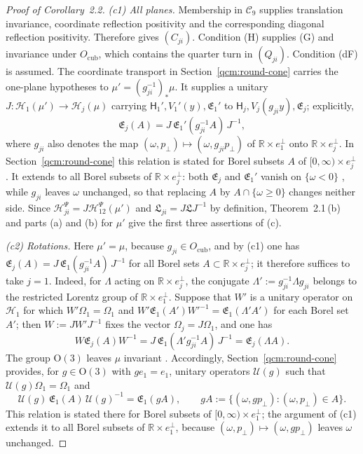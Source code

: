\documentclass[11pt,letterpaper,reqno]{amsart}
\theoremstyle{definition}
\begin{document}
\begin{proof}[Proof of Corollary~2.2]
\emph{(c1) All planes.}
Membership in $\mathcal C_9$ supplies translation invariance, coordinate reflection positivity and the corresponding diagonal reflection positivity. Therefore \cite[Proposition~7.2]{QEDConstruction} gives $(C_{ji})$.
Condition (H) supplies (G) and invariance under $O_{\mathrm{cub}}$, which contains the quarter turn in $(Q_{ji})$. Condition (dF) is assumed.
The coordinate transport in Section~\ref{qcm:round-cone} carries the one-plane hypotheses to $\mu'=(g_{ji}^{-1})_*\mu$. It supplies a unitary $J:\mathcal H_1(\mu')\to\mathcal H_j(\mu)$ carrying $\mathsf H_1',V_1'(y),\mathfrak E_1'$ to $\mathsf H_j,V_j(g_{ji}y),\mathfrak E_j$; explicitly,
\begin{equation*}
\mathfrak E_j(A)=J\,\mathfrak E_1'(g_{ji}^{-1}A)\,J^{-1},
\end{equation*}
where $g_{ji}$ also denotes the map $(\omega,p_\perp)\mapsto(\omega,g_{ji}p_\perp)$ of $\mathbb R\times e_1^\perp$ onto $\mathbb R\times e_j^\perp$.
In Section~\ref{qcm:round-cone} this relation is stated for Borel subsets $A$ of $[0,\infty)\times e_j^\perp$.
It extends to all Borel subsets of $\mathbb R\times e_j^\perp$: both $\mathfrak E_j$ and $\mathfrak E_1'$ vanish on $\{\omega<0\}$ \cite[Proposition~7.2]{QEDConstruction}, while $g_{ji}$ leaves $\omega$ unchanged, so that replacing $A$ by $A\cap\{\omega\ge0\}$ changes neither side.
Since $\mathcal H^{\Psi}_{ji}=J\mathcal H^{\Psi}_{12}(\mu')$ and $\mathfrak L_{ji}=J\mathfrak LJ^{-1}$ by definition, Theorem~2.1\,(b) and parts (a) and (b) for $\mu'$ give the first three assertions of (c).

\emph{(c2) Rotations.}
Here $\mu'=\mu$, because $g_{ji}\in O_{\mathrm{cub}}$, and by (c1) one has $\mathfrak E_j(A)=J\,\mathfrak E_1(g_{ji}^{-1}A)\,J^{-1}$ for all Borel sets $A\subset\mathbb R\times e_j^\perp$; it therefore suffices to take $j=1$.
Indeed, for $\Lambda$ acting on $\mathbb R\times e_j^\perp$, the conjugate $\Lambda':=g_{ji}^{-1}\Lambda g_{ji}$ belongs to the restricted Lorentz group of $\mathbb R\times e_1^\perp$.
Suppose that $W'$ is a unitary operator on $\mathcal H_1$ for which $W'\Omega_1=\Omega_1$ and $W'\mathfrak E_1(A')W'^{-1}=\mathfrak E_1(\Lambda'A')$ for each Borel set $A'$; then $W:=JW'J^{-1}$ fixes the vector $\Omega_j=J\Omega_1$, and one has
\begin{equation*}
W\mathfrak E_j(A)W^{-1}=J\,\mathfrak E_1(\Lambda'g_{ji}^{-1}A)\,J^{-1}=\mathfrak E_j(\Lambda A).
\end{equation*}
The group $\mathrm O(3)$ leaves $\mu$ invariant \cite[Theorem~8.6]{QEDConstruction}.
Accordingly, Section~\ref{qcm:round-cone} provides, for $g\in\mathrm O(3)$ with $ge_1=e_1$, unitary operators $\mathcal U(g)$ such that $\mathcal U(g)\Omega_1=\Omega_1$ and
\begin{equation*}
\mathcal U(g)\,\mathfrak E_1(A)\,\mathcal U(g)^{-1}=\mathfrak E_1(gA),\qquad gA:=\{(\omega,gp_\perp):(\omega,p_\perp)\in A\}.
\end{equation*}
This relation is stated there for Borel subsets of $[0,\infty)\times e_1^\perp$; the argument of (c1) extends it to all Borel subsets of $\mathbb R\times e_1^\perp$, because $(\omega,p_\perp)\mapsto(\omega,gp_\perp)$ leaves $\omega$ unchanged.


\end{proof}
\end{document}
